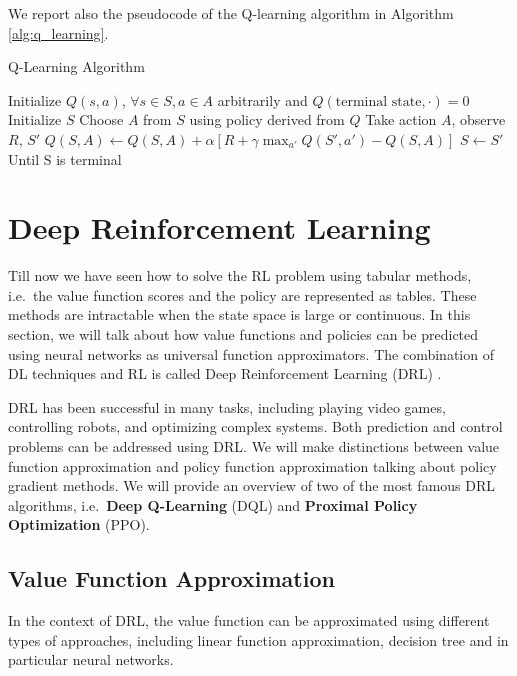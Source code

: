 We report also the pseudocode of the Q-learning algorithm in Algorithm \ref{alg:q_learning}.


\begin{algorithm}
\caption{Q-Learning Algorithm}\label{alg:q_learning}
\begin{algorithmic}
\State Initialize $Q(s, a)$,  $\forall s \in S, a \in A$ arbitrarily and $Q(\text{terminal state}, \cdot) = 0$
    \State Initialize $S$
        \State Choose $A$ from $S$ using policy derived from $Q$
        \State Take action $A$, observe $R$, $S'$
        \State $Q(S, A) \leftarrow Q(S, A) + \alpha [R + \gamma \max_{a'} Q(S', a') - Q(S, A)]$
        \State $S \leftarrow S'$
    \EndFor
\State Until S is terminal
\EndFor




\end{algorithmic}
\end{algorithm}



\section{Deep Reinforcement Learning}
\label{sec:drl}
Till now we have seen how to solve the RL problem using tabular methods, i.e.\ the value function scores and the policy are represented as tables.
These methods are intractable when the state space is large or continuous.
In this section, we will talk about how value functions and policies can be predicted using neural networks as universal function approximators.
The combination of DL techniques and RL is called Deep Reinforcement Learning (DRL) \citep{mnih2015human}.

DRL has been successful in many tasks, including playing video games, controlling robots, and optimizing complex systems.
Both prediction and control problems can be addressed using DRL.
We will make distinctions between value function approximation and policy function approximation talking about policy gradient methods. 
We will provide an overview of two of the most famous DRL algorithms, i.e.\ \textbf{Deep Q-Learning} (DQL) and \textbf{Proximal Policy Optimization} (PPO).


\subsection{Value Function Approximation}
\label{subsec:value_function_approx}
In the context of DRL, the value function can be approximated using different types of approaches, including linear function approximation, decision tree and in particular neural networks.

